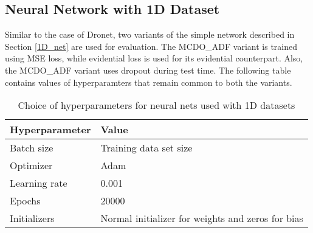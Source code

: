 \subsection{Neural Network with 1D Dataset}
Similar to the case of Dronet, two variants of the simple network described in Section \ref{1D_net} are used for evaluation. The MCDO\_ADF variant is trained using MSE loss, while evidential loss is used for its evidential counterpart. Also, the MCDO\_ADF variant uses dropout during test time. The following table contains values of hyperparamters that remain common to both the variants.
\begin{table}[H]
	\centering
	\begin{tabular}{|l|l|} 
		\hline
		\textbf{Hyperparameter} & \textbf{Value}                         \\ 
		\hline
		Batch size              & Training data set size                 \\ 
		\hline
		Optimizer               & Adam                                   \\ 
		\hline
		Learning rate           & 0.001                                  \\ 
		\hline
		Epochs                  & 20000                                  \\ 
		\hline
		Initializers            & Normal initializer for weights and zeros for bias  \\
		\hline
	\end{tabular}
	\caption{Choice of hyperparameters for neural nets used with 1D datasets}
\end{table}
